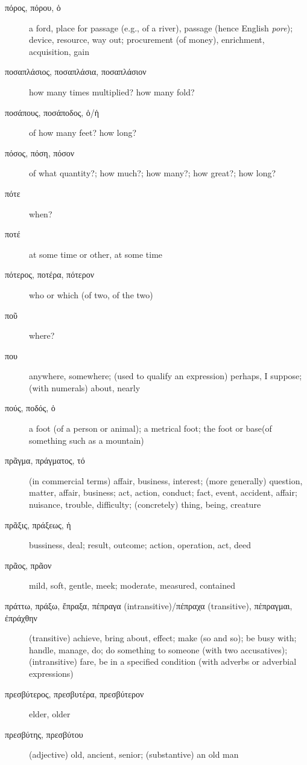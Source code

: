 \documentclass[12pt,letterpaper]{article}
\begin{document}
\begin{description}
    \item[\textgreek{πόρος, πόρου, ὁ}] a ford, place for passage (e.g., of a river), passage (hence English \textit{pore}); device, resource, way out; procurement (of money), enrichment, acquisition, gain
    \item[\textgreek{ποσαπλάσιος, ποσαπλάσια, ποσαπλάσιον}] how many times multiplied? how many fold?
    \item[\textgreek{ποσάπους, ποσάποδος, ὁ/ἡ}] of how many feet? how long?
    \item[\textgreek{πόσος, πόση, πόσον}] of what quantity?; how much?; how many?; how great?; how long?
    \item[\textgreek{πότε}] \marginnote{*}when?
    \item[\textgreek{ποτέ}] \marginnote{*}at some time or other, at some time
    \item[\textgreek{πότερος, ποτέρα, πότερον}] \marginnote{*}who or which (of two, of the two)
    \item[\textgreek{ποῦ}] \marginnote{*}where?
    \item[\textgreek{που}] \marginnote{*}anywhere, somewhere; (used to qualify an expression) perhaps, I suppose; (with numerals) about, nearly
    \item[\textgreek{πούς, ποδός, ὁ}] \marginnote{*}a foot (of a person or animal); a metrical foot; the foot or base(of something such as a mountain)
    \item[\textgreek{πρᾶγμα, πράγματος, τό}] \marginnote{*}(in commercial terms) affair, business, interest; (more generally) question, matter, affair, business; act, action, conduct; fact, event, accident, affair; nuisance, trouble, difficulty; (concretely) thing, being, creature
    \item[\textgreek{πρᾶξις, πράξεως, ἡ}] \marginnote{*}bussiness, deal; result, outcome; action, operation, act, deed
    \item[\textgreek{πρᾶος, πρᾶον}] mild, soft, gentle, meek; moderate, measured, contained
    \item[\textgreek{πράττω, πράξω, ἔπραξα, πέπραγα (intransitive)/πέπραχα (transitive), πέπραγμαι, ἐπράχθην}] (transitive) achieve, bring about, effect; make (so and so); be busy with; handle, manage, do; do something to someone (with two accusatives); (intransitive) fare, be in a specified condition (with adverbs or adverbial expressions)
    \item[\textgreek{πρεσβύτερος, πρεσβυτέρα, πρεσβύτερον}] \marginnote{*}elder, older
    \item[\textgreek{πρεσβύτης, πρεσβύτου}] (adjective) old, ancient, senior; (substantive) an old man

\end{description}
\end{document}
